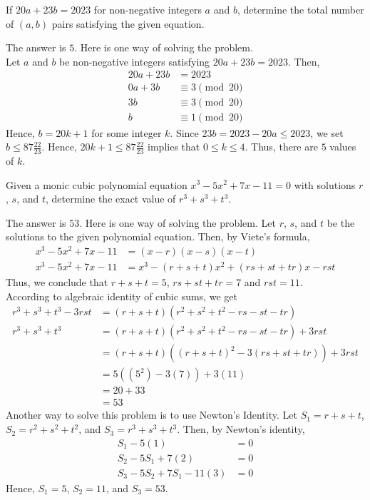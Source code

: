 \begin{problem}
If $20a+23b=2023$ for non-negative integers $a$ and $b$, determine the total number of $(a,b)$ pairs satisfying the given equation.
\end{problem}

\begin{solution}
The answer is $5$. Here is one way of solving the problem.\\
	Let $a$ and $b$ be non-negative integers satisfying $20a+23b=2023$. Then,
	\begin{align*}
		20a+23b&=2023\\
		0a+3b&\equiv 3 \pmod{20}\\
		3b&\equiv 3 \pmod{20}\\
		b&\equiv 1 \pmod{20}
	\end{align*}
	Hence, $b=20k+1$ for some integer $k$. Since $23b=2023-20a\leq 2023$, we set $b\leq 87\frac{22}{23}$. Hence, $20k+1 \leq 87\frac{22}{23}$ implies that $0\leq k \leq 4$. Thus, there are $5$ values of $k$.
\end{solution}

\begin{problem}
Given a monic cubic polynomial equation $x^3-5x^2+7x-11=0$ with solutions $r$, $s$, and $t$, determine the exact value of $r^3+s^3+t^3$.
\end{problem}

\begin{solution}
The answer is $53$. Here is one way of solving the problem. Let $r$, $s$, and $t$ be the solutions to the given polynomial equation. Then, by Viete's formula,
	\begin{align*}
		x^3-5x^2+7x-11 &= (x-r)(x-s)(x-t)\\
		x^3-5x^2+7x-11 &= x^3-(r+s+t)x^2+(rs+st+tr)x-rst
	\end{align*}
	Thus, we conclude that $r+s+t=5$, $rs+st+tr=7$ and $rst=11$.\\
	\bigskip
	According to algebraic identity of cubic sums, we get
	\begin{align*}
	r^3+s^3+t^3-3rst &= (r+s+t)(r^2+s^2+t^2-rs-st-tr)\\
	r^3+s^3+t^3 &= (r+s+t)(r^2+s^2+t^2-rs-st-tr)+3rst\\
	&= (r+s+t)((r+s+t)^2-3(rs+st+tr))+3rst\\
	&=5((5^2)-3(7))+3(11)\\
	&=20+33\\
	&=53
	\end{align*}
	Another way to solve this problem is to use Newton's Identity. Let $S_1=r+s+t$, $S_2= r^2+s^2+t^2$, and $S_3=r^3+s^3+t^3$. Then, by Newton's identity,
	\begin{align*}
		S_1-5(1)&=0\\
		S_2-5S_1+7(2)&=0\\
		S_3-5S_2+7S_1-11(3)&=0
	\end{align*}
	Hence, $S_1=5$, $S_2=11$, and $S_3=53$.
\end{solution}

